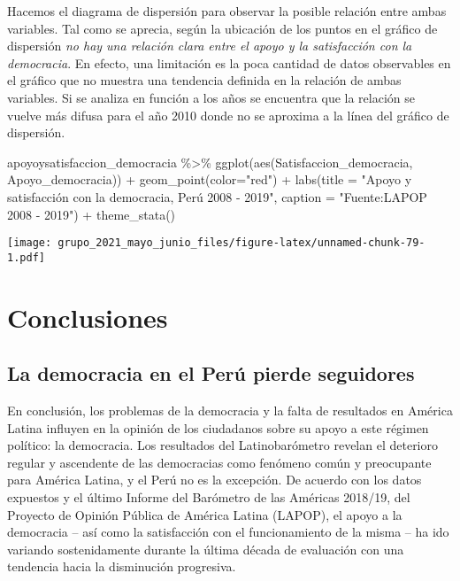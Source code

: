 \documentclass[
]{book}
\newenvironment{Shaded}{\begin{snugshade}}{\end{snugshade}}
\newcommand{\AttributeTok}[1]{\textcolor[rgb]{0.77,0.63,0.00}{#1}}
\newcommand{\FunctionTok}[1]{\textcolor[rgb]{0.00,0.00,0.00}{#1}}
\newcommand{\NormalTok}[1]{#1}
\newcommand{\SpecialCharTok}[1]{\textcolor[rgb]{0.00,0.00,0.00}{#1}}
\newcommand{\StringTok}[1]{\textcolor[rgb]{0.31,0.60,0.02}{#1}}
\begin{document}
Hacemos el diagrama de dispersión para observar la posible relación entre ambas variables. Tal como se aprecia, según la ubicación de los puntos en el gráfico de dispersión \emph{no hay una relación clara entre el apoyo y la satisfacción con la democracia}. En efecto, una limitación es la poca cantidad de datos observables en el gráfico que no muestra una tendencia definida en la relación de ambas variables. Si se analiza en función a los años se encuentra que la relación se vuelve más difusa para el año 2010 donde no se aproxima a la línea del gráfico de dispersión.

\begin{Shaded}
\begin{Highlighting}[]
\NormalTok{apoyoysatisfaccion\_democracia }\SpecialCharTok{\%\textgreater{}\%}
  \FunctionTok{ggplot}\NormalTok{(}\FunctionTok{aes}\NormalTok{(Satisfaccion\_democracia, Apoyo\_democracia)) }\SpecialCharTok{+}
  \FunctionTok{geom\_point}\NormalTok{(}\AttributeTok{color=}\StringTok{"red"}\NormalTok{) }\SpecialCharTok{+}
  \FunctionTok{labs}\NormalTok{(}\AttributeTok{title =} \StringTok{"Apoyo y satisfacción con la democracia, Perú 2008 {-} 2019"}\NormalTok{, }
       \AttributeTok{caption =} \StringTok{"Fuente:LAPOP 2008 {-} 2019"}\NormalTok{) }\SpecialCharTok{+}
  \FunctionTok{theme\_stata}\NormalTok{()}
\end{Highlighting}
\end{Shaded}

\texttt{[image: grupo\_2021\_mayo\_junio\_files/figure-latex/unnamed-chunk-79-1.pdf]}

\hypertarget{conclusiones-3}{%
\section{Conclusiones}\label{conclusiones-3}}

\hypertarget{la-democracia-en-el-peruxfa-pierde-seguidores}{%
\subsection{La democracia en el Perú pierde seguidores}\label{la-democracia-en-el-peruxfa-pierde-seguidores}}

En conclusión, los problemas de la democracia y la falta de resultados en América Latina influyen en la opinión de los ciudadanos sobre su apoyo a este régimen político: la democracia. Los resultados del Latinobarómetro revelan el deterioro regular y ascendente de las democracias como fenómeno común y preocupante para América Latina, y el Perú no es la excepción. De acuerdo con los datos expuestos y el último Informe del Barómetro de las Américas 2018/19, del Proyecto de Opinión Pública de América Latina (LAPOP), el apoyo a la democracia -- así como la satisfacción con el funcionamiento de la misma -- ha ido variando sostenidamente durante la última década de evaluación con una tendencia hacia la disminución progresiva.
\end{document}
